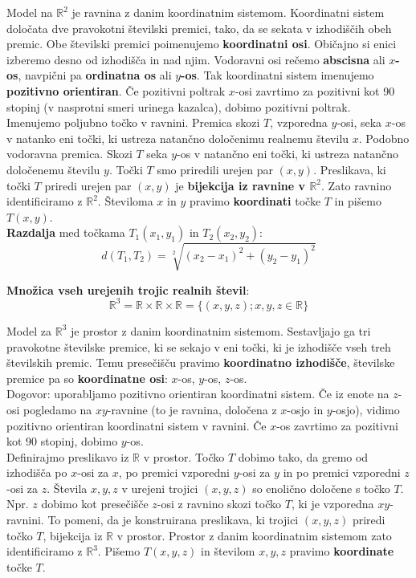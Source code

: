 \documentclass[a4paper,12pt]{article}
\begin{document}
Model na $\mathbb{R}^2$ je ravnina z danim koordinatnim sistemom. Koordinatni sistem določata dve pravokotni številski premici, tako, da se sekata v izhodiščih obeh premic. Obe številski premici poimenujemo \textbf{koordinatni osi}. Običajno si enici izberemo desno od izhodišča in nad njim. Vodoravni osi rečemo \textbf{abscisna} ali \textbf{$x$-os}, navpični pa \textbf{ordinatna os} ali \textbf{$y$-os}. Tak koordinatni sistem imenujemo \textbf{pozitivno orientiran}. Če pozitivni poltrak $x$-osi zavrtimo za pozitivni kot 90 stopinj (v nasprotni smeri urinega kazalca), dobimo pozitivni poltrak. \\

Imenujemo poljubno točko v ravnini. Premica skozi $T$, vzporedna $y$-osi, seka $x$-os v natanko eni točki, ki ustreza natančno določenimu realnemu številu $x$. Podobno vodoravna premica. Skozi $T$ seka $y$-os v natančno eni točki, ki ustreza natančno določenemu številu $y$. Točki $T$ smo priredili urejen par $(x,y)$. Preslikava, ki točki $T$ priredi urejen par $(x,y)$ je \textbf{bijekcija iz ravnine v $\mathbb{R}^2$}. Zato ravnino identificiramo z $\mathbb{R}^2$. Številoma $x$ in $y$ pravimo \textbf{koordinati} točke $T$ in pišemo $T(x,y)$. \\

\textbf{Razdalja} med točkama $T_1(x_1,y_1)$ in $T_2(x_2,y_2)$: $$d(T_1,T_2) = \sqrt[2]{(x_2 - x_1)^2 + (y_2 - y_1)^2}$$ 

\textbf{Množica vseh urejenih trojic realnih števil}: $$\mathbb{R}^3 = \mathbb{R} \times \mathbb{R} \times \mathbb{R} = \{(x,y,z) ; x,y,z \in \mathbb{R} \}$$

Model za $\mathbb{R}^3$ je prostor z danim koordinatnim sistemom. Sestavljajo ga tri pravokotne številske premice, ki se sekajo v eni točki, ki je izhodišče vseh treh številskih premic. Temu presečišču pravimo \textbf{koordinatno izhodišče}, številske premice pa so \textbf{koordinatne osi}: $x$-os, $y$-os, $z$-os. \\

Dogovor: uporabljamo pozitivno orientiran koordinatni sistem. Če iz enote na $z$-osi pogledamo na $xy$-ravnine (to je ravnina, določena z $x$-osjo in $y$-osjo), vidimo pozitivno orientiran koordinatni sistem v ravnini. Če $x$-os zavrtimo za pozitivni kot 90 stopinj, dobimo $y$-os. \\

Definirajmo preslikavo iz $\mathbb{R}$ v prostor. Točko $T$ dobimo tako, da gremo od izhodišča po $x$-osi za $x$, po premici vzporedni $y$-osi za $y$ in po premici vzporedni $z$-osi za $z$. Števila $x,y,z$ v urejeni trojici $(x,y,z)$ so enolično določene s točko $T$. Npr. $z$ dobimo kot presečišče $z$-osi z ravnino skozi točko $T$, ki je vzporedna $xy$-ravnini. To pomeni, da je konstruirana preslikava, ki trojici $(x,y,z)$ priredi točko $T$, bijekcija iz $\mathbb{R}$ v prostor. Prostor z danim \linebreak koordinatnim sistemom zato identificiramo z $\mathbb{R}^3$. Pišemo $T(x,y,z)$ in številom $x,y,z$ pravimo \textbf{koordinate} točke $T$. \\
\end{document}
